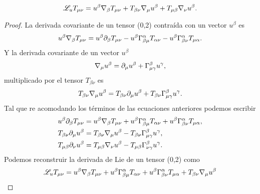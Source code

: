 \begin{equation}
    \mathscr{L}_u T_{\mu \nu} = u^\beta \mathbf{\nabla}_\beta T_{\mu \nu}+T_{\beta \nu}\mathbf{\nabla}_\mu u^\beta +T_{\mu \beta } \mathbf{\nabla}_\nu u^\beta.
\end{equation}

\begin{proof}

    La derivada covariante de un tensor (0,2) contraída con un vector $u^\beta$ es
    \begin{equation}
        u^\beta \mathbf{\nabla}_\beta T_{\mu \nu} = u^\beta \partial_\beta T_{\mu \nu} - u^\beta \Gamma_{\beta \mu}^\alpha T_{\alpha \nu} - u^\beta \Gamma_{\beta \nu}^\alpha T_{\mu \alpha}.
    \end{equation}
    Y la derivada covariante de un vector $u^\beta$
    \begin{equation}
        \mathbf{\nabla}_\mu u^\beta =  \partial_\mu u^\beta + \Gamma^\beta_{\mu \gamma} u^\gamma,
    \end{equation}
    multiplicado por el tensor $T_{\beta \nu}$ es
    \begin{equation}
        T_{\beta \nu}\mathbf{\nabla}_\mu u^\beta =  T_{\beta \nu}\partial_\mu u^\beta +T_{\beta \nu}\Gamma^\beta_{\mu \gamma} u^\gamma.
    \end{equation}
    Tal que re acomodando los términos de las ecuaciones anteriores podemos escribir
    \begin{equation}
        \begin{aligned}
            u^\beta \partial_\beta T_{\mu \nu}  & = u^\beta \mathbf{\nabla}_\beta T_{\mu \nu} +u^\beta \Gamma_{\beta \mu}^\alpha T_{\alpha \nu} + u^\beta \Gamma_{\beta \nu}^\alpha T_{\mu \alpha}, \\
            T_{\beta \nu}\partial_\mu u^\beta   & = T_{\beta \nu}\mathbf{\nabla}_\mu u^\beta - T_{\beta \nu}\Gamma^\beta_{\mu \gamma} u^\gamma                                                 ,    \\
            T_{\mu \beta } \partial_\nu u^\beta & = T_{\mu \beta } \mathbf{\nabla}_\nu u^\beta -  T_{\mu \beta } \Gamma^\beta_{\nu \gamma} u^\gamma.
        \end{aligned}
    \end{equation}
    Podemos reconstruir la derivada de Lie de un tensor (0,2) como
    \begin{equation}
        \begin{aligned}
            \mathscr{L}_u T_{\mu \nu} & = u^\beta \v{\nabla}_\beta T_{\mu \nu} +u^\beta \Gamma_{\beta \mu}^\alpha T_{\alpha \nu} + u^\beta \Gamma_{\beta \nu}^\alpha T_{\mu \alpha} + T_{\beta \nu}\v{\nabla}_\mu u^\beta                                                                                               \\

\end{aligned}
\end{equation}
\end{proof}
